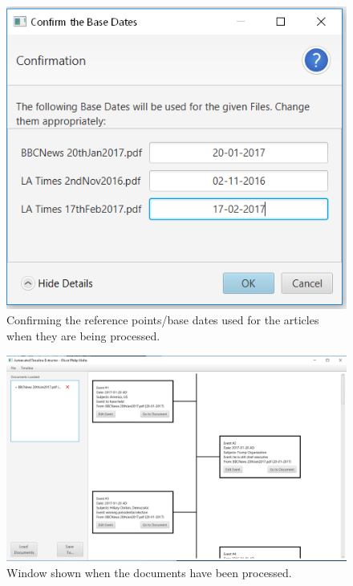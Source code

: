 \begin{figure}[H]
\caption{Confirming the reference points/base dates used for the articles when they are being processed.}
\label{fig:confirmArticles}
\includegraphics{confirmArticles.PNG}
\centering
\end{figure}

\begin{figure}[H]
\caption{Window shown when the documents have been processed.}
\label{fig:loaded}
\includegraphics[width=\linewidth]{loaded.PNG}
\centering
\end{figure}


